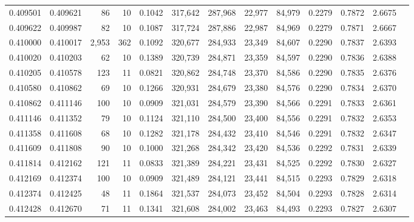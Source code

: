 \begin{tabular}{rrrrrrrrrrrrr}
0.409501 & 0.409621 &    86 &  10 &                                     0.1042 & 317,642 & 287,968 &  22,977 &  84,979 & 0.2279 & 0.7872 & 2.6675 \\
0.409622 & 0.409987 &    82 &  10 &                                     0.1087 & 317,724 & 287,886 &  22,987 &  84,969 & 0.2279 & 0.7871 & 2.6667 \\
0.410000 & 0.410017 & 2,953 & 362 &                                     0.1092 & 320,677 & 284,933 &  23,349 &  84,607 & 0.2290 & 0.7837 & 2.6393 \\
0.410020 & 0.410203 &    62 &  10 &                                     0.1389 & 320,739 & 284,871 &  23,359 &  84,597 & 0.2290 & 0.7836 & 2.6388 \\
0.410205 & 0.410578 &   123 &  11 &                                     0.0821 & 320,862 & 284,748 &  23,370 &  84,586 & 0.2290 & 0.7835 & 2.6376 \\
0.410580 & 0.410862 &    69 &  10 &                                     0.1266 & 320,931 & 284,679 &  23,380 &  84,576 & 0.2290 & 0.7834 & 2.6370 \\
0.410862 & 0.411146 &   100 &  10 &                                     0.0909 & 321,031 & 284,579 &  23,390 &  84,566 & 0.2291 & 0.7833 & 2.6361 \\
0.411146 & 0.411352 &    79 &  10 &                                     0.1124 & 321,110 & 284,500 &  23,400 &  84,556 & 0.2291 & 0.7832 & 2.6353 \\
0.411358 & 0.411608 &    68 &  10 &                                     0.1282 & 321,178 & 284,432 &  23,410 &  84,546 & 0.2291 & 0.7832 & 2.6347 \\
0.411609 & 0.411808 &    90 &  10 &                                     0.1000 & 321,268 & 284,342 &  23,420 &  84,536 & 0.2292 & 0.7831 & 2.6339 \\
0.411814 & 0.412162 &   121 &  11 &                                     0.0833 & 321,389 & 284,221 &  23,431 &  84,525 & 0.2292 & 0.7830 & 2.6327 \\
0.412169 & 0.412374 &   100 &  10 &                                     0.0909 & 321,489 & 284,121 &  23,441 &  84,515 & 0.2293 & 0.7829 & 2.6318 \\
0.412374 & 0.412425 &    48 &  11 &                                     0.1864 & 321,537 & 284,073 &  23,452 &  84,504 & 0.2293 & 0.7828 & 2.6314 \\
0.412428 & 0.412670 &    71 &  11 &                                     0.1341 & 321,608 & 284,002 &  23,463 &  84,493 & 0.2293 & 0.7827 & 2.6307 \\

\end{tabular}
